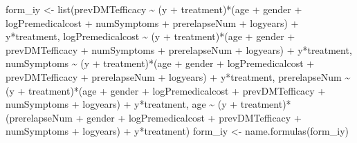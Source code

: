 \documentclass[
  letterpaper,
  DIV=11,
  numbers=noendperiod]{scrreprt}
\newenvironment{Shaded}{\begin{snugshade}}{\end{snugshade}}
\newcommand{\FunctionTok}[1]{\textcolor[rgb]{0.28,0.35,0.67}{#1}}
\newcommand{\NormalTok}[1]{\textcolor[rgb]{0.00,0.23,0.31}{#1}}
\newcommand{\OtherTok}[1]{\textcolor[rgb]{0.00,0.23,0.31}{#1}}
\newcommand{\SpecialCharTok}[1]{\textcolor[rgb]{0.37,0.37,0.37}{#1}}
\begin{document}
\begin{Shaded}
\begin{Highlighting}[]
\NormalTok{form\_iy }\OtherTok{\textless{}{-}} \FunctionTok{list}\NormalTok{(prevDMTefficacy }\SpecialCharTok{\textasciitilde{}}\NormalTok{ (y }\SpecialCharTok{+}\NormalTok{ treatment)}\SpecialCharTok{*}\NormalTok{(age }\SpecialCharTok{+}\NormalTok{ gender }\SpecialCharTok{+}\NormalTok{ logPremedicalcost }\SpecialCharTok{+}\NormalTok{ numSymptoms }\SpecialCharTok{+}\NormalTok{ prerelapseNum }\SpecialCharTok{+}\NormalTok{ logyears) }\SpecialCharTok{+}\NormalTok{ y}\SpecialCharTok{*}\NormalTok{treatment,}
\NormalTok{                logPremedicalcost }\SpecialCharTok{\textasciitilde{}}\NormalTok{ (y }\SpecialCharTok{+}\NormalTok{ treatment)}\SpecialCharTok{*}\NormalTok{(age }\SpecialCharTok{+}\NormalTok{ gender }\SpecialCharTok{+}\NormalTok{ prevDMTefficacy }\SpecialCharTok{+}\NormalTok{ numSymptoms }\SpecialCharTok{+}\NormalTok{ prerelapseNum }\SpecialCharTok{+}\NormalTok{ logyears) }\SpecialCharTok{+}\NormalTok{ y}\SpecialCharTok{*}\NormalTok{treatment,}
\NormalTok{                numSymptoms }\SpecialCharTok{\textasciitilde{}}\NormalTok{ (y }\SpecialCharTok{+}\NormalTok{ treatment)}\SpecialCharTok{*}\NormalTok{(age }\SpecialCharTok{+}\NormalTok{ gender }\SpecialCharTok{+}\NormalTok{ logPremedicalcost }\SpecialCharTok{+}\NormalTok{ prevDMTefficacy }\SpecialCharTok{+}\NormalTok{ prerelapseNum }\SpecialCharTok{+}\NormalTok{ logyears) }\SpecialCharTok{+}\NormalTok{ y}\SpecialCharTok{*}\NormalTok{treatment,}
\NormalTok{                prerelapseNum }\SpecialCharTok{\textasciitilde{}}\NormalTok{ (y }\SpecialCharTok{+}\NormalTok{ treatment)}\SpecialCharTok{*}\NormalTok{(age }\SpecialCharTok{+}\NormalTok{ gender }\SpecialCharTok{+}\NormalTok{ logPremedicalcost }\SpecialCharTok{+}\NormalTok{ prevDMTefficacy }\SpecialCharTok{+}\NormalTok{ numSymptoms }\SpecialCharTok{+}\NormalTok{ logyears) }\SpecialCharTok{+}\NormalTok{ y}\SpecialCharTok{*}\NormalTok{treatment,}
\NormalTok{                age }\SpecialCharTok{\textasciitilde{}}\NormalTok{ (y }\SpecialCharTok{+}\NormalTok{ treatment)}\SpecialCharTok{*}\NormalTok{(prerelapseNum }\SpecialCharTok{+}\NormalTok{ gender }\SpecialCharTok{+}\NormalTok{ logPremedicalcost }\SpecialCharTok{+}\NormalTok{ prevDMTefficacy }\SpecialCharTok{+}\NormalTok{ numSymptoms }\SpecialCharTok{+}\NormalTok{ logyears) }\SpecialCharTok{+}\NormalTok{ y}\SpecialCharTok{*}\NormalTok{treatment)}
\NormalTok{form\_iy }\OtherTok{\textless{}{-}} \FunctionTok{name.formulas}\NormalTok{(form\_iy)}
\end{Highlighting}
\end{Shaded}
\end{document}
